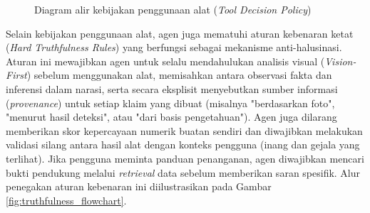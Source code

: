 \begin{figure}[H]
{}
    \caption{Diagram alir kebijakan penggunaan alat (\textit{Tool Decision Policy})}
    \label{fig:tool_decision_flowchart}
\end{figure}

Selain kebijakan penggunaan alat, agen juga mematuhi aturan kebenaran ketat (\textit{Hard Truthfulness Rules}) yang berfungsi sebagai mekanisme anti-halusinasi. Aturan ini mewajibkan agen untuk selalu mendahulukan analisis visual (\textit{Vision-First}) sebelum menggunakan alat, memisahkan antara observasi fakta dan inferensi dalam narasi, serta secara eksplisit menyebutkan sumber informasi (\textit{provenance}) untuk setiap klaim yang dibuat (misalnya "berdasarkan foto", "menurut hasil deteksi", atau "dari basis pengetahuan"). Agen juga dilarang memberikan skor kepercayaan numerik buatan sendiri dan diwajibkan melakukan validasi silang antara hasil alat dengan konteks pengguna (inang dan gejala yang terlihat). Jika pengguna meminta panduan penanganan, agen diwajibkan mencari bukti pendukung melalui \textit{retrieval} data sebelum memberikan saran spesifik. Alur penegakan aturan kebenaran ini diilustrasikan pada Gambar \ref{fig:truthfulness_flowchart}.

